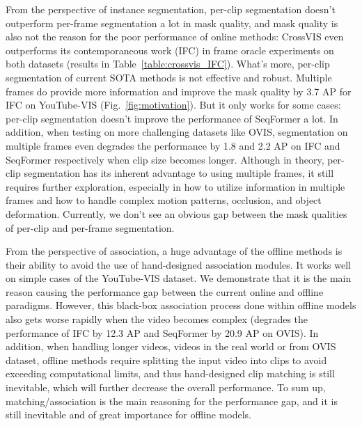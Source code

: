 \documentclass[runningheads]{llncs}
\begin{document}
From the perspective of instance segmentation, per-clip segmentation doesn't outperform per-frame segmentation a lot in mask quality, and mask quality is also not the reason for the poor performance of online methods: CrossVIS even outperforms its contemporaneous work (\ie IFC) in frame oracle experiments on both datasets (results in Table~\ref{table:crossvis_IFC}). What's more, per-clip segmentation of current SOTA methods is not effective and robust. Multiple frames do provide more information and improve the mask quality by 3.7 AP for IFC on YouTube-VIS (Fig.~\ref{fig:motivation}). But it only works for some cases: per-clip segmentation doesn't improve the performance of SeqFormer a lot. In addition, when testing on more challenging datasets like OVIS, segmentation on multiple frames even degrades the performance by 1.8 and 2.2 AP on IFC and SeqFormer respectively when clip size becomes longer.
Although in theory, per-clip segmentation has its inherent advantage to using multiple frames, it still requires further exploration, especially in how to utilize information in multiple frames and how to handle complex motion patterns, occlusion, and object deformation. Currently, we don't see an obvious gap between the mask qualities of per-clip and per-frame segmentation. 

From the perspective of association, a huge advantage of the offline methods is their ability to avoid the use of hand-designed association modules. It works well on simple cases of the YouTube-VIS dataset. We demonstrate that it is the main reason causing the performance gap between the current online and offline paradigms. However, this black-box association process done within offline models also gets worse rapidly when the video becomes complex (degrades the performance of IFC by 12.3 AP and SeqFormer by 20.9 AP on OVIS). In addition, when handling longer videos, \eg videos in the real world or from OVIS dataset, offline methods require splitting the input video into clips to avoid exceeding computational limits, and thus hand-designed clip matching is still inevitable, which will further decrease the overall performance. To sum up, matching/association is the main reasoning for the performance gap, and it is still inevitable and of great importance for offline models.
\end{document}

